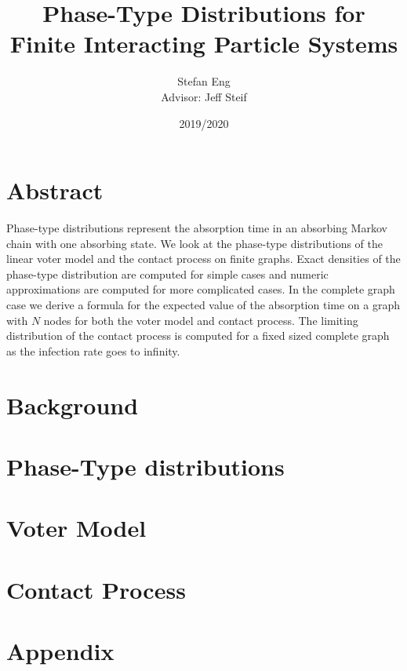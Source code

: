 \documentclass[11pt]{report}
\title{Phase-Type Distributions for Finite Interacting Particle Systems}
\author{Stefan Eng\\
    Advisor: Jeff Steif
}
\date{2019/2020}
\theoremstyle{plain}
\theoremstyle{definition}
\theoremstyle{remark}
\numberwithin{equation}{section}
\begin{document}
\maketitle

\chapter*{Abstract}
Phase-type distributions represent the absorption time in an absorbing Markov chain with one absorbing state.
We look at the phase-type distributions of the linear voter model and the contact process on finite graphs.
Exact densities of the phase-type distribution are computed for simple cases and numeric approximations are computed for more complicated cases.
In the complete graph case we derive a formula for the expected value of the absorption time on a graph with $N$ nodes for both the voter model and contact process.
The limiting distribution of the contact process is computed for a fixed sized complete graph as the infection rate goes to infinity.




\tableofcontents
\clearpage

% 

\chapter{Background}


\chapter{Phase-Type distributions}


\chapter{Voter Model}


\chapter{Contact Process}


\appendix
\chapter{Appendix}


\clearpage


\end{document}
